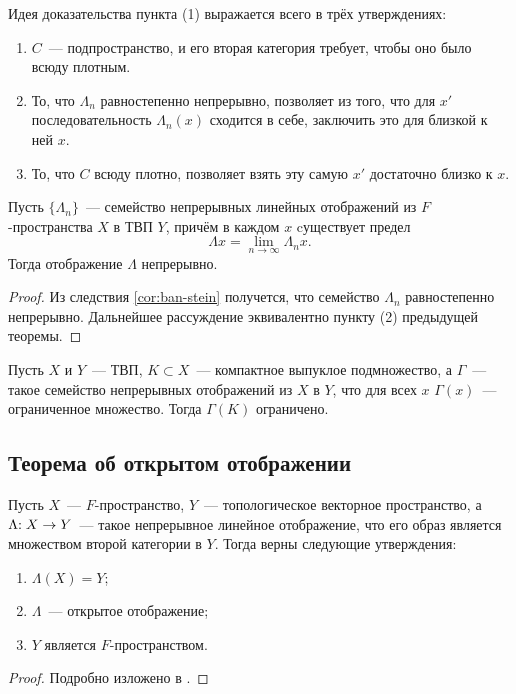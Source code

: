 \documentclass{notes}
\begin{document}
	\begin{rem}
		Идея доказательства пункта (1) выражается всего в трёх утверждениях:
		\begin{enumerate}
			\item $C$~--- подпространство, и его вторая категория требует, чтобы оно было всюду плотным.
			\item То, что $\Lambda_n$ равностепенно непрерывно, позволяет из того, что для $x'$ последовательность $\Lambda_n(x)$ сходится в себе, заключить это для близкой к ней $x$. 
			\item То, что $C$ всюду плотно, позволяет взять эту самую $x'$ достаточно близко к $x$.
 		\end{enumerate}
	\end{rem}

	\begin{thm} \label{thm:lim-cont-1}
		Пусть $\{\Lambda_n\}$~--- семейство непрерывных линейных отображений из $F$-пространства $X$ в ТВП $Y$, причём в каждом $x$ cуществует предел
		\[
			\Lambda x = \lim\limits_{n \to \infty} \Lambda_n x.
		\]
		Тогда отображение $\Lambda$ непрерывно.
		\begin{proof}
			Из следствия \ref{cor:ban-stein} получется, что семейство $\Lambda_n$ равностепенно непрерывно. Дальнейшее рассуждение эквивалентно пункту (2) предыдущей теоремы. 
		\end{proof}
	\end{thm}

	\begin{thm}
		Пусть $X$ и $Y$~--- ТВП, $K \subset X$~--- компактное выпуклое подмножество, а $\Gamma$~--- такое семейство непрерывных отображений из $X$ в $Y$, что для всех $x$ $\Gamma(x)$~--- ограниченное множество. Тогда $\Gamma(K)$ ограничено.
	\end{thm}

\subsection{Теорема об открытом отображении}
	
	\begin{thm} \label{thm:open-map}
		Пусть $X$~--- $F$-пространство, $Y$~--- топологическое векторное пространство, а $\Lambda\text{\text{:}} \; X \to Y$~--- такое непрерывное линейное отображение, что его образ является множеством второй категории в $Y$. Тогда верны следующие утверждения:
		\begin{enumerate}
			\item $\Lambda(X) = Y$;
			\item $\Lambda$~--- открытое отображение;
			\item $Y$ является $F$-пространством.
		\end{enumerate}
		\begin{proof}
			Подробно изложено в \cite[с. 58--60]{R}.
		\end{proof}
	\end{thm}
\end{document}
